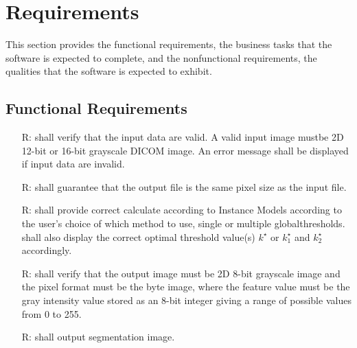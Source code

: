 \documentclass[12pt]{article}
\begin{document}
\section{Requirements}

This section provides the functional requirements, the business tasks that the
software is expected to complete, and the nonfunctional requirements, the
qualities that the software is expected to exhibit.

\subsection{Functional Requirements}

\noindent \begin{itemize}

\item[R\refstepcounter{reqnum}\thereqnum \label{R_Inputs}:] 
\progname{} shall verify that the input data are valid. A valid input image
mustbe 2D 12-bit or 16-bit grayscale DICOM image. An error message shall be
displayed if input data are invalid.

\item[R\refstepcounter{reqnum}\thereqnum \label{R_OutputInputs}:] 
\progname{} shall guarantee that the output file is the same pixel size as the
input file.

\item[R\refstepcounter{reqnum}\thereqnum \label{R_Calculate}:]
\progname{} shall provide correct calculate according to Instance Models
according to the user's choice of which method to use, single or multiple
globalthresholds. \progname{} shall also display the correct optimal threshold
value(s) $k^{\star}$ or $k^{\star}_{1}$ and $k^{\star}_{2}$ accordingly.

\item[R\refstepcounter{reqnum}\thereqnum \label{R_VerifyOutput}:] \progname{}
  shall verify that the output image must be 2D 8-bit grayscale image and the
  pixel format must be the byte image, where the feature value must be the gray
  intensity value stored as an 8-bit integer giving a range of possible values
  from 0 to 255. 

\item[R\refstepcounter{reqnum}\thereqnum \label{R_Outputk}:] 
\progname{} shall output segmentation image.

\end{itemize}
\end{document}
